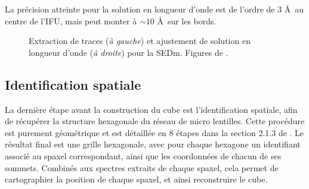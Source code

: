 \documentclass[../main/main.tex]{subfiles}
\begin{document}
La précision atteinte pour la solution en longueur d'onde est de l'ordre
de $3$ \AA\ au centre de l'IFU, mais peut monter à $\sim10$ \AA\ sur les bords.

\begin{figure}[ht]
\centering
{}\hfill
{}
\caption[Extraction de traces et solution en longueur
d'onde pour la
SEDm.]{Extraction de traces (\textit{à gauche}) et ajustement de solution en longueur
  d'onde (\textit{à droite}) pour la SEDm. Figures de \citet{pysedm}.}
\label{fig:calibsedm}
\end{figure}

\subsection{Identification spatiale}\label{ssec:spaceid}
La dernière étape avant la construction du cube est l'identification
spatiale, afin de récupérer la structure hexagonale du réseau de micro
lentilles.
Cette procédure est purement géométrique et est détaillée en 8 étapes
dans la section 2.1.3 de \citet{pysedm}. Le résultat final est une
grille hexagonale, avec pour chaque hexagone un identifiant associé au
spaxel correspondant, ainsi que les coordonnées de chacun de ses sommets.
Combinés aux spectres extraits de chaque spaxel, cela permet de
cartographier la position de chaque spaxel, et ainsi reconstruire le
cube.
\end{document}
